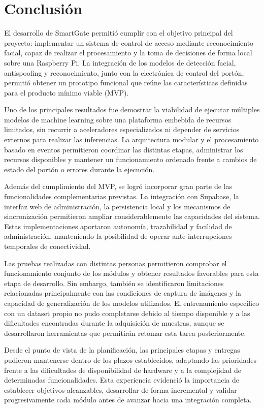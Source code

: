 \chapter{Conclusión}

El desarrollo de SmartGate permitió cumplir con el objetivo principal del proyecto: implementar un sistema de control de acceso mediante reconocimiento facial, capaz de realizar el procesamiento y la toma de decisiones de forma local sobre una Raspberry Pi. La integración de los modelos de detección facial, antispoofing y reconocimiento, junto con la electrónica de control del portón, permitió obtener un prototipo funcional que reúne las características definidas para el producto mínimo viable (MVP).

Uno de los principales resultados fue demostrar la viabilidad de ejecutar múltiples modelos de machine learning sobre una plataforma embebida de recursos limitados, sin recurrir a aceleradores especializados ni depender de servicios externos para realizar las inferencias. La arquitectura modular y el procesamiento basado en eventos permitieron coordinar las distintas etapas, administrar los recursos disponibles y mantener un funcionamiento ordenado frente a cambios de estado del portón o errores durante la ejecución.

Además del cumplimiento del MVP, se logró incorporar gran parte de las funcionalidades complementarias previstas. La integración con Supabase, la interfaz web de administración, la persistencia local y los mecanismos de sincronización permitieron ampliar considerablemente las capacidades del sistema. Estas implementaciones aportaron autonomía, trazabilidad y facilidad de administración, manteniendo la posibilidad de operar ante interrupciones temporales de conectividad.

Las pruebas realizadas con distintas personas permitieron comprobar el funcionamiento conjunto de los módulos y obtener resultados favorables para esta etapa de desarrollo. Sin embargo, también se identificaron limitaciones relacionadas principalmente con las condiciones de captura de imágenes y la capacidad de generalización de los modelos utilizados. El entrenamiento específico con un dataset propio no pudo completarse debido al tiempo disponible y a las dificultades encontradas durante la adquisición de muestras, aunque se desarrollaron herramientas que permitirán retomar esta tarea posteriormente.

Desde el punto de vista de la planificación, las principales etapas y entregas pudieron mantenerse dentro de los plazos establecidos, adaptando las prioridades frente a las dificultades de disponibilidad de hardware y a la complejidad de determinadas funcionalidades. Esta experiencia evidenció la importancia de establecer objetivos alcanzables, desarrollar de forma incremental y validar progresivamente cada módulo antes de avanzar hacia una integración completa.

